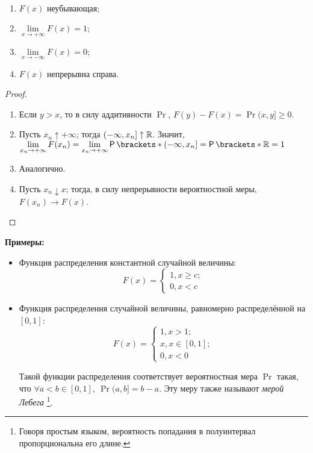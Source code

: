 \begin{lemma}
	\ 
	\begin{enumerate}
		\item
		$F(x)$ неубывающая;
		\item
		\(\lim\limits_{x\to +\infty} F(x)= 1;\)
		\item
		\(\lim\limits_{x\to -\infty} F(x)= 0;\)
		\item
		$F(x)$ непрерывна справа.
	\end{enumerate}
\end{lemma}
\begin{proof}
	\ 
	\begin{enumerate}
		\item Если $y > x$, то в силу аддитивности $\Pr$, $F(y) - F(x) = \Pr{(x, y]} \geq 0.$
		\item Пусть $x_n \uparrow +\infty$; тогда $(-\infty, x_n] \uparrow \mathbb{R}$. Значит,
		\(
		\lim\limits_{x_n\to +\infty} F(x_n) =
		\lim\limits_{x_n\to +\infty} \Pr{(-\infty, x_n]} =
		\Pr{\R} =
		1
		\)
		\item Аналогично.
		\item Пусть $x_n \downarrow x$; тогда, в силу непрерывности вероятностной меры, $F(x_n) \to
		F(x)$.
	\end{enumerate}
\end{proof}

\textbf{Примеры:}
\begin{itemize}
	\item
    Функция распределения константной случайной величины:
    \[
        F(x) =
        \begin{cases}
	        1, x\geq c;\\
	        0, x < c
	    \end{cases}
    \]

	\item
    Функция распределения случайной величины, равномерно распределённой на $[0, 1]$:
    \[
        F(x) =
        \begin{cases}
	        1, x > 1;\\
	        x, x\in [0, 1];\\
	        0, x < 0
	    \end{cases}
    \]

	Такой функции распределения соответствует вероятностная мера $\Pr$ такая, что \(\forall a < b \in
	[0, 1],\ \Pr{(a, b]} = b - a\). Эту меру также называют \emph{мерой Лебега} \footnote{Говоря простым
    языком, вероятность попадания в полуинтервал пропорциональна его длине.}.
\end{itemize}
